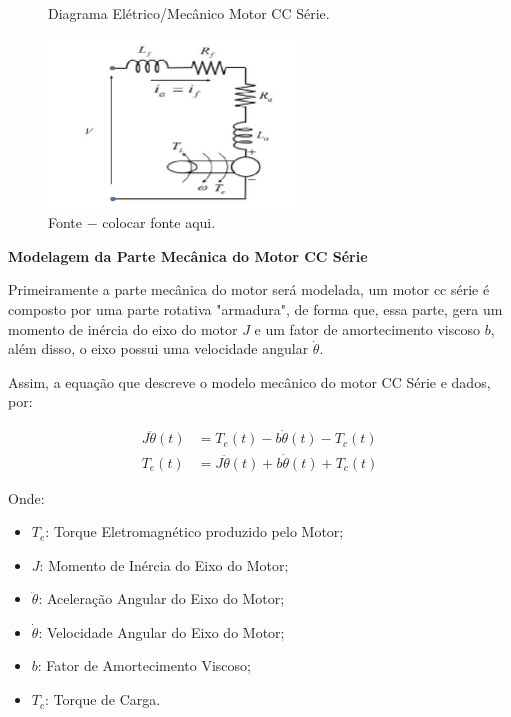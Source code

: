 \begin{figure}[h]
	\centering
	\caption{Diagrama Elétrico/Mecânico Motor CC Série.}
	\includegraphics[width=0.6\textwidth]{Capitulos/4_desenvolvimento/4_figuras/diagrama_motorcc.png}
	\caption*{Fonte $-$ colocar fonte aqui.}
	\label{fig:image_02}
\end{figure}



\noindent \textbf{Modelagem da Parte Mecânica do Motor CC Série}

Primeiramente a parte mecânica do motor será modelada, um motor cc série é composto por uma parte rotativa "armadura", de forma que, essa parte, gera um momento de inércia do eixo do motor $J$ e um fator de amortecimento viscoso $b$, além disso, o eixo possui uma velocidade angular $\dot{\theta}$.

Assim, a equação que descreve o modelo mecânico do motor CC Série e dados, por:

\begin{align}
	J\ddot{\theta}(t) &= T_e(t) - b\dot{\theta}(t) - T_c(t) \label{eq4:eq1} \\
	T_e(t) &= J\ddot{\theta}(t) + b\dot{\theta}(t) + T_c(t) \label{eq4:eq2}
\end{align}


Onde:
\begin{itemize}
	\item $T_e$: Torque Eletromagnético produzido pelo Motor;
	\item $J$: Momento de Inércia do Eixo do Motor;
	\item $\ddot{\theta}$: Aceleração Angular do Eixo do Motor;
	\item $\dot{\theta}$: Velocidade Angular do Eixo do Motor;
	\item $b$: Fator de Amortecimento Viscoso;
	\item $T_c$: Torque de Carga.
\end{itemize}

